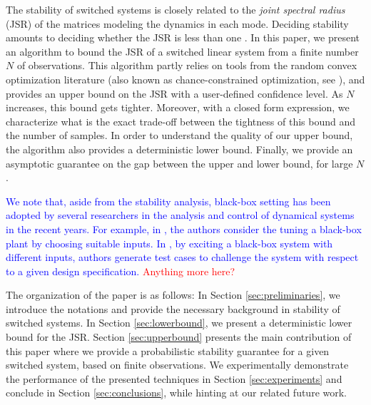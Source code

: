 The stability of switched systems is closely related to the \emph{joint spectral radius} (JSR) of the matrices modeling the dynamics in each mode. Deciding stability amounts to deciding whether the JSR is less than one \cite{jungersBook}. In this paper, we present an algorithm to bound the JSR of a switched linear system from a finite number $N$ of observations. This algorithm partly relies on tools from the random convex optimization literature (also known as chance-constrained optimization, see \cite{campi,nemirovski,campi-garatti}), and provides an upper bound on the JSR with a user-defined confidence level. As $N$ increases, this bound gets tighter. Moreover, with a closed form expression, we characterize what is the exact trade-off between the tightness of this bound and the number of samples. In order to understand the quality of our upper bound, the algorithm also provides a deterministic lower bound. Finally, we provide an asymptotic guarantee on the gap between the upper and lower bound, for large $N$.

\textcolor{blue}{We note that, aside from the stability analysis, black-box setting has been adopted by several researchers in the analysis and control of dynamical systems in the recent years. For example, in \cite{bianchini}, the authors consider the tuning a black-box plant by choosing suitable inputs. In \cite{balkan}, by exciting a black-box system with different inputs, authors generate test cases to challenge the system with respect to a given design specification.} \textcolor{red}{Anything more here?}

The organization of the paper is as follows: In Section \ref{sec:preliminaries}, we introduce the notations and provide the necessary background in stability of switched systems. In Section \ref{sec:lowerbound}, we present a deterministic lower bound for the JSR. Section \ref{sec:upperbound} presents the main
contribution of this paper where we provide a probabilistic stability guarantee for a given switched system, based on finite observations. We experimentally demonstrate the performance of the presented techniques in Section \ref{sec:experiments} and conclude in Section \ref{sec:conclusions}, while hinting at our related future work.

